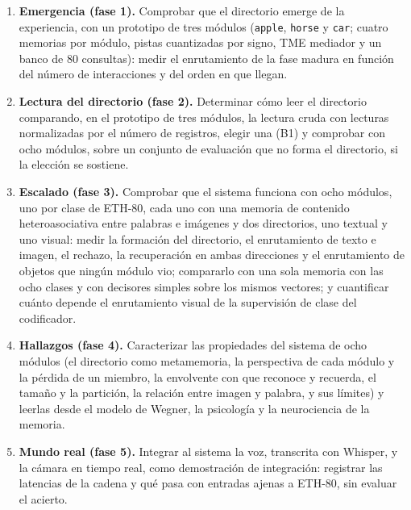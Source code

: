 \begin{enumerate}
    \item \label{oe:emergencia}
    \textbf{Emergencia (fase 1).}
    Comprobar que el directorio emerge de la experiencia, con un prototipo de tres módulos
    (\texttt{apple}, \texttt{horse} y \texttt{car}; cuatro memorias por módulo, pistas
    cuantizadas por signo, TME mediador y un banco de 80 consultas): medir el enrutamiento
    de la fase madura en función del número de interacciones y del orden en que llegan.

    \item \label{oe:lectura}
    \textbf{Lectura del directorio (fase 2).}
    Determinar cómo leer el directorio comparando, en el prototipo de tres módulos, la
    lectura cruda con lecturas normalizadas por el número de registros, elegir una (B1) y
    comprobar con ocho módulos, sobre un conjunto de evaluación que no forma el
    directorio, si la elección se sostiene.

    \item \label{oe:escalado}
    \textbf{Escalado (fase 3).}
    Comprobar que el sistema funciona con ocho módulos, uno por clase de ETH-80, cada uno
    con una memoria de contenido heteroasociativa entre palabras e imágenes y dos
    directorios, uno textual y uno visual: medir la formación del directorio, el
    enrutamiento de texto e imagen, el rechazo, la recuperación en ambas direcciones y el
    enrutamiento de objetos que ningún módulo vio; compararlo con una sola memoria con las
    ocho clases y con decisores simples sobre los mismos vectores; y cuantificar cuánto
    depende el enrutamiento visual de la supervisión de clase del codificador.

    \item \label{oe:hallazgos}
    \textbf{Hallazgos (fase 4).}
    Caracterizar las propiedades del sistema de ocho módulos (el directorio como
    metamemoria, la perspectiva de cada módulo y la pérdida de un miembro, la envolvente
    con que reconoce y recuerda, el tamaño y la partición, la relación entre imagen y
    palabra, y sus límites) y leerlas desde el modelo de Wegner, la psicología y la
    neurociencia de la memoria.

    \item \label{oe:mundo-real}
    \textbf{Mundo real (fase 5).}
    Integrar al sistema la voz, transcrita con Whisper, y la cámara en tiempo real, como
    demostración de integración: registrar las latencias de la cadena y qué pasa con
    entradas ajenas a ETH-80, sin evaluar el acierto.
\end{enumerate}

